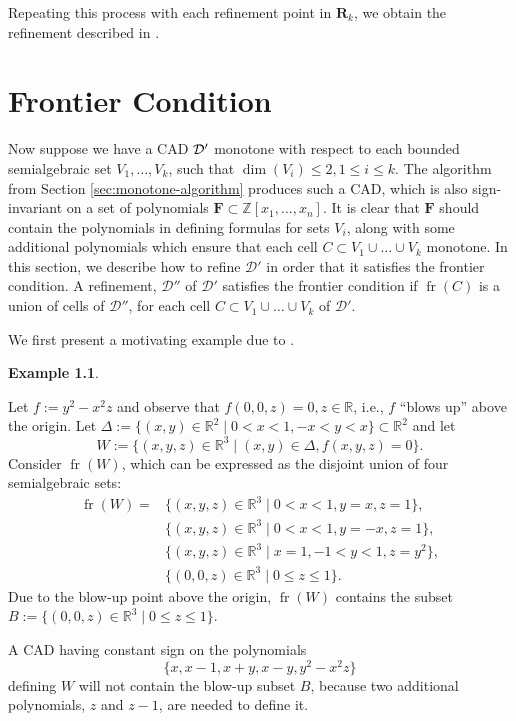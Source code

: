 \documentclass[
]{book}
\theoremstyle{definition}
\theoremstyle{definition}
\newtheorem{example}{Example}[chapter]
\theoremstyle{definition}
\theoremstyle{definition}
\theoremstyle{remark}
\begin{document}
Repeating this process with each refinement point in \(\mathbf{R}_k\), we obtain the refinement described in \citep[Lemma 3.11]{bgv15}.

\hypertarget{sec:frontier}{%
\chapter{Frontier Condition}\label{sec:frontier}}

Now suppose we have a CAD \(\cal D'\) monotone with respect to each bounded semialgebraic set \(V_1,\ldots,V_k\), such that \(\dim(V_i) \le 2, 1 \le i \le k\).
The algorithm from Section \ref{sec:monotone-algorithm} produces such a CAD, which is also sign-invariant on a set of polynomials \(\mathbf{F} \subset \mathbb{Z}[x_1,\ldots,x_n]\). It is clear that \(\mathbf{F}\) should contain the polynomials in defining formulas for sets \(V_i\), along with some additional polynomials which ensure that each cell \(C \subset V_1 \cup \ldots \cup V_k\) monotone.
In this section, we describe how to refine \(\mathcal{D'}\) in order that it satisfies the frontier condition. A refinement, \(\mathcal{D''}\) of \(\mathcal{D'}\) satisfies the frontier condition if \({\operatorname{fr} \left( C \right)}\) is a union of cells of \(\mathcal{D''}\), for each cell \(C \subset V_1 \cup \ldots \cup V_k\) of \(\mathcal{D'}\).

We first present a motivating example due to \citet{jhd20}.

\begin{example}
\protect\hypertarget{exm:whitney-jhd}{}\label{exm:whitney-jhd}\citep[Example 2.1]{jhd20}

Let \(f := y^2 - x^2 z\) and observe that \(f(0,0,z) = 0, z \in \mathbb{R}\), i.e., \(f\) ``blows up'' above the origin. Let \(\Delta := \{(x,y) \in \mathbb{R}^2 \mid 0 < x < 1, -x < y < x \} \subset \mathbb{R}^2\) and let
\[
W := \{ (x,y,z) \in \mathbb{R}^3 \mid (x,y) \in \Delta, f(x,y,z) = 0 \}.
\]
Consider \({\operatorname{fr} \left( W \right)}\), which can be expressed as the disjoint union of four semialgebraic sets:
\begin{align*}
{\operatorname{fr} \left( W \right)} =& \{ (x,y,z) \in \mathbb{R}^3 \mid 0 < x < 1, y = x, z = 1 \}, \\
& \{ (x,y,z) \in \mathbb{R}^3 \mid 0 < x < 1, y = -x, z = 1 \}, \\
& \{ (x,y,z) \in \mathbb{R}^3 \mid x = 1, -1 < y < 1, z = y^2 \}, \\
& \{ (0,0,z) \in \mathbb{R}^3 \mid 0 \le z \le 1 \}.
\end{align*}
Due to the blow-up point above the origin, \({\operatorname{fr} \left( W \right)}\) contains the subset \(B := \{ (0,0,z) \in \mathbb{R}^3 \mid 0 \le z \le 1 \}\).

A CAD having constant sign on the polynomials
\[
\{ x, x - 1, x + y, x - y, y^2 - x^2 z \}
\] defining \(W\) will not contain the blow-up subset \(B\), because two additional polynomials, \(z\) and \(z-1\), are needed to define it.
\end{example}
\end{document}

